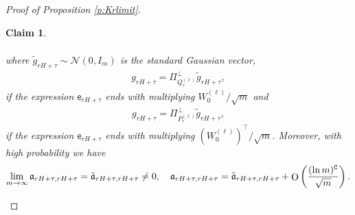 \documentclass{article}
\numberwithin{equation}{section}
\renewcommand{\cal}{\mathcal}
\newcommand{\cN}{{\cal N}}
\newcommand{\fC}{{\mathtt C}}
\newcommand{\fa}{{\frak a}}
\newcommand{\sfe}{{\mathsf e}}
\DeclareMathOperator{\OO}{O}
\newcommand{\1}{\mathds{1}}
\theoremstyle{plain} %
\newtheorem{claim}[theorem]{Claim}
\begin{document}
\begin{proof}[Proof of Proposition \ref{p:Krlimit}]
\begin{claim}
\begin{enumerate}[{\rm (i)}]
\begin{align*}
\end{align*}
where $\tilde g_{rH+\tau}\sim \cN(0, I_m)$ is the standard Gaussian vector, 
\begin{align*}
g_{rH+\tau}=\Pi_{Q_\tau^{(\ell)}}^\perp \tilde g_{rH+\tau},
\end{align*}
if the expression $\sfe_{rH+\tau}$ ends with multiplying $W_0^{(\ell)}/\sqrt m$
and 
\begin{align*}
g_{rH+\tau}=\Pi_{P_\tau^{(\ell)}}^\perp \tilde g_{rH+\tau},
\end{align*}
 if the expression $\sfe_{rH+\tau}$ ends with multiplying $(W_0^{(\ell)})^{\top}/\sqrt m$. 
 Moreover, with high probability we have
\begin{align*}
\lim_{m\rightarrow \infty}\fa_{rH+\tau,rH+\tau}=\tilde \fa_{rH+\tau,rH+\tau}\neq 0, \quad \fa_{rH+\tau,rH+\tau}=\tilde \fa_{rH+\tau,rH+\tau}+\OO\left(\frac{(\ln m)^{\fC}}{\sqrt m}\right).
\end{align*}


\end{enumerate}
\end{claim}


\end{proof}
\end{document}
